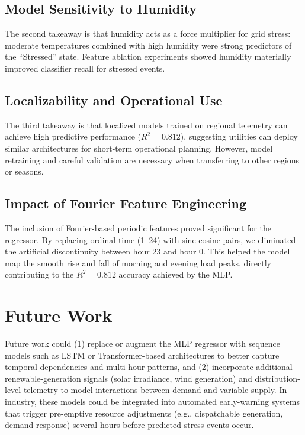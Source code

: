 \documentclass[11pt]{article}
\begin{document}
\subsection{Model Sensitivity to Humidity}
The second takeaway is that humidity acts as a force multiplier for grid stress: moderate temperatures combined with high humidity were strong predictors of the ``Stressed'' state. Feature ablation experiments showed humidity materially improved classifier recall for stressed events.

\subsection{Localizability and Operational Use}
The third takeaway is that localized models trained on regional telemetry can achieve high predictive performance (\(R^{2}=0.812\)), suggesting utilities can deploy similar architectures for short-term operational planning. However, model retraining and careful validation are necessary when transferring to other regions or seasons.

\subsection{Impact of Fourier Feature Engineering}
The inclusion of Fourier-based periodic features proved significant for the regressor. By replacing ordinal time (1–24) with sine-cosine pairs, we eliminated the artificial discontinuity between hour 23 and hour 0. This helped the model map the smooth rise and fall of morning and evening load peaks, directly contributing to the $R^{2}=0.812$ accuracy achieved by the MLP.

\section{Future Work}
Future work could (1) replace or augment the MLP regressor with sequence models such as LSTM or Transformer-based architectures to better capture temporal dependencies and multi-hour patterns, and (2) incorporate additional renewable-generation signals (solar irradiance, wind generation) and distribution-level telemetry to model interactions between demand and variable supply. In industry, these models could be integrated into automated early-warning systems that trigger pre-emptive resource adjustments (e.g., dispatchable generation, demand response) several hours before predicted stress events occur.
\end{document}
